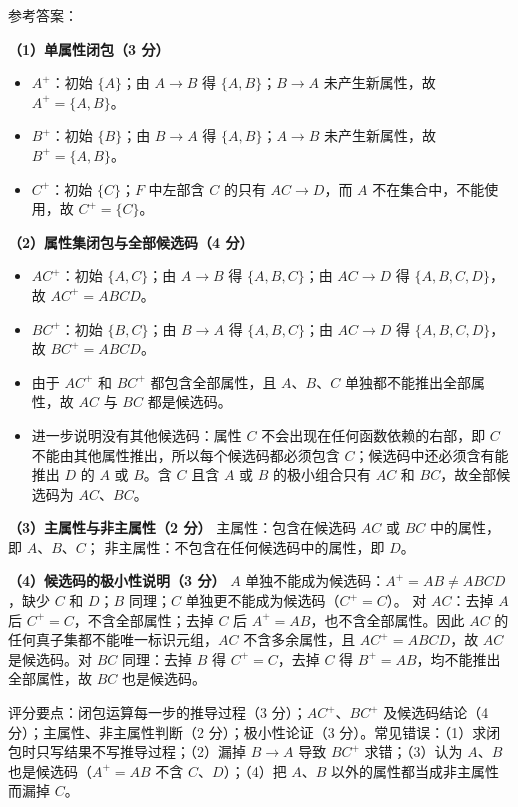 \documentclass[a4paper,11pt]{article}
\begin{document}
\q 参考答案：

\textbf{（1）单属性闭包（3 分）}
\begin{itemize}[leftmargin=1.6em, itemsep=1pt]
  \item $A^{+}$：初始 $\{A\}$；由 $A\to B$ 得 $\{A,B\}$；$B\to A$ 未产生新属性，故 $A^{+}=\{A,B\}$。
  \item $B^{+}$：初始 $\{B\}$；由 $B\to A$ 得 $\{A,B\}$；$A\to B$ 未产生新属性，故 $B^{+}=\{A,B\}$。
  \item $C^{+}$：初始 $\{C\}$；$F$ 中左部含 $C$ 的只有 $AC\to D$，而 $A$ 不在集合中，不能使用，故 $C^{+}=\{C\}$。
\end{itemize}

\textbf{（2）属性集闭包与全部候选码（4 分）}
\begin{itemize}[leftmargin=1.6em, itemsep=1pt]
  \item $AC^{+}$：初始 $\{A,C\}$；由 $A\to B$ 得 $\{A,B,C\}$；由 $AC\to D$ 得 $\{A,B,C,D\}$，故 $AC^{+}=ABCD$。
  \item $BC^{+}$：初始 $\{B,C\}$；由 $B\to A$ 得 $\{A,B,C\}$；由 $AC\to D$ 得 $\{A,B,C,D\}$，故 $BC^{+}=ABCD$。
  \item 由于 $AC^{+}$ 和 $BC^{+}$ 都包含全部属性，且 $A$、$B$、$C$ 单独都不能推出全部属性，故 $AC$ 与 $BC$ 都是候选码。
  \item 进一步说明没有其他候选码：属性 $C$ 不会出现在任何函数依赖的右部，即 $C$ 不能由其他属性推出，所以每个候选码都必须包含 $C$；候选码中还必须含有能推出 $D$ 的 $A$ 或 $B$。含 $C$ 且含 $A$ 或 $B$ 的极小组合只有 $AC$ 和 $BC$，故全部候选码为 $AC$、$BC$。
\end{itemize}

\textbf{（3）主属性与非主属性（2 分）}
主属性：包含在候选码 $AC$ 或 $BC$ 中的属性，即 $A$、$B$、$C$；
非主属性：不包含在任何候选码中的属性，即 $D$。

\textbf{（4）候选码的极小性说明（3 分）}
$A$ 单独不能成为候选码：$A^{+}=AB\ne ABCD$，缺少 $C$ 和 $D$；$B$ 同理；$C$ 单独更不能成为候选码（$C^{+}=C$）。
对 $AC$：去掉 $A$ 后 $C^{+}=C$，不含全部属性；去掉 $C$ 后 $A^{+}=AB$，也不含全部属性。因此 $AC$ 的任何真子集都不能唯一标识元组，$AC$ 不含多余属性，且 $AC^{+}=ABCD$，故 $AC$ 是候选码。对 $BC$ 同理：去掉 $B$ 得 $C^{+}=C$，去掉 $C$ 得 $B^{+}=AB$，均不能推出全部属性，故 $BC$ 也是候选码。
\begin{analysis}评分要点：闭包运算每一步的推导过程（3 分）；$AC^{+}$、$BC^{+}$ 及候选码结论（4 分）；主属性、非主属性判断（2 分）；极小性论证（3 分）。常见错误：（1）求闭包时只写结果不写推导过程；（2）漏掉 $B\to A$ 导致 $BC^{+}$ 求错；（3）认为 $A$、$B$ 也是候选码（$A^{+}=AB$ 不含 $C$、$D$）；（4）把 $A$、$B$ 以外的属性都当成非主属性而漏掉 $C$。\end{analysis}
\end{document}
